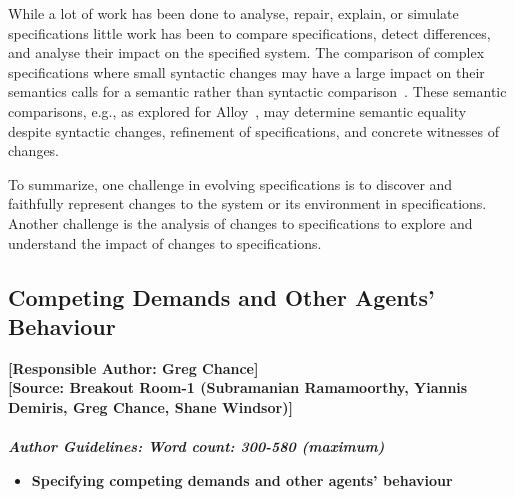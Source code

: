 \documentclass[sigconf]{acmart}
\begin{document}
While a lot of work has been done to analyse, repair, explain, or simulate specifications little work has been to compare specifications, detect differences, and analyse their impact on the specified system. The comparison of complex specifications where small syntactic changes may have a large impact on their semantics calls for a semantic rather than syntactic comparison~\cite{MaozRR14j}. These semantic comparisons, e.g., as explored for Alloy~\cite{RingertW20}, may determine semantic equality despite syntactic changes, refinement of specifications, and concrete witnesses of changes.

To summarize, one challenge in evolving specifications is to discover and faithfully represent changes to the system or its environment in specifications. 
Another challenge is the analysis of changes to specifications to explore and understand the impact of changes to specifications.

\subsection{Competing Demands and Other Agents' Behaviour}
\noindent\textbf{[Responsible Author:  Greg Chance]}\\
\noindent \textbf{[Source: Breakout Room-1 (Subramanian Ramamoorthy, Yiannis Demiris, Greg Chance, Shane Windsor)]}\\\\
\noindent\textbf{\textit{Author Guidelines: Word count: 300-580 (maximum)}}\\
\begin{itemize}
 	\item \textbf{Specifying competing demands and other agents' behaviour}
 \end{itemize}
\end{document}
